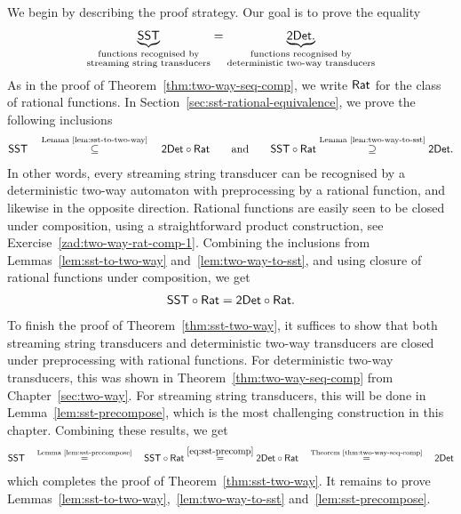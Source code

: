 We begin by describing   the proof strategy. 
Our goal is to prove the equality
\begin{align}\label{eq:sst}
\underbrace{\mathsf{SST}}_{\substack{\text{functions recognised by} \\ \text{streaming string transducers}}} = \underbrace{\mathsf{2Det}.}_{\substack{\text{functions recognised by} \\ \text{deterministic two-way transducers}}}	
\end{align}
As in the proof of Theorem~\ref{thm:two-way-seq-comp}, we  write $\mathsf{Rat}$ for the class of rational functions.
In Section~\ref{sec:sst-rational-equivalence}, we prove  the following inclusions
\begin{align*}
\mathsf{SST} \quad \stackrel{\text{Lemma~\ref{lem:sst-to-two-way}}}   \subseteq \quad \mathsf{2Det} \circ \mathsf{Rat} \qquad\text{and} \qquad	   \mathsf{SST} \circ \mathsf{Rat} \stackrel{\text{Lemma~\ref{lem:two-way-to-sst}}}  \supseteq \mathsf{2Det}.
\end{align*}
In other words, every streaming string transducer can be recognised by a deterministic two-way automaton with preprocessing by a rational function, and likewise in the opposite direction. Rational functions are easily seen to be closed under composition, using a straightforward product construction, see Exercise~\ref{zad:two-way-rat-comp-1}. Combining the inclusions from Lemmas~\ref{lem:sst-to-two-way} and~\ref{lem:two-way-to-sst}, and using closure of rational functions under composition, we get 
  \begin{align}\label{eq:sst-precomp}
\mathsf{SST} \circ \mathsf{Rat}  = \mathsf{2Det} \circ \mathsf{Rat}.
\end{align}
To finish the proof of Theorem~\ref{thm:sst-two-way}, it suffices to show that both streaming string transducers and deterministic two-way transducers are closed under preprocessing with rational functions. For deterministic two-way transducers, this was shown in  Theorem~\ref{thm:two-way-seq-comp} from Chapter~\ref{sec:two-way}. For  streaming string transducers, this will be done in  Lemma~\ref{lem:sst-precompose}, which is the most challenging construction in this chapter. Combining these results, we get
\begin{align*}
\mathsf{SST} \quad \stackrel{\text{Lemma~\ref{lem:sst-precompose}}} = \quad \mathsf{SST} \circ \mathsf{Rat} \stackrel{\eqref{eq:sst-precomp}} = \mathsf{2Det} \circ \mathsf{Rat} \quad \stackrel{\text{Theorem~\ref{thm:two-way-seq-comp}}} = \quad \mathsf{2Det}
\end{align*}
which completes the proof of Theorem~\ref{thm:sst-two-way}. It remains to prove Lemmas~\ref{lem:sst-to-two-way},~\ref{lem:two-way-to-sst} and~\ref{lem:sst-precompose}.



